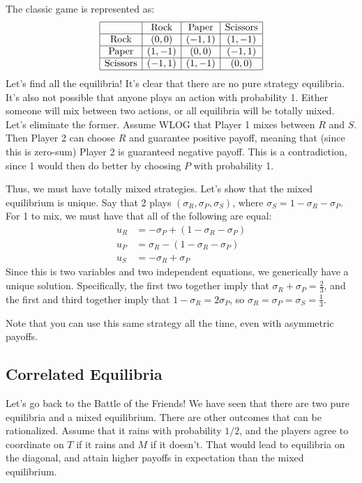 \documentclass[10pt]{article}
\begin{document}
\begin{example}
	 The classic game is represented as:
	\[
	\begin{array}{|c|c|c|c|}
		\hline
		& \text{Rock} & \text{Paper} & \text{Scissors} \\\hline
		\text{Rock} & (0,0) & (-1,1) & (1,-1) \\\hline
		\text{Paper} & (1,-1) & (0,0) & (-1,1) \\\hline 
		\text{Scissors} & (-1,1) & (1,-1) & (0,0) \\\hline
	\end{array}
	\]
	Let's find all the equilibria! It's clear that there are no pure strategy equilibria. It's also not possible that anyone plays an action with probability 1. Either someone will mix between two actions, or all equilibria will be totally mixed. Let's eliminate the former. Assume WLOG that Player 1 mixes between $R$ and $S$. Then Player 2 can choose $R$ and guarantee positive payoff, meaning that (since this is zero-sum) Player 2 is guaranteed negative payoff. This is a contradiction, since 1 would then do better by choosing $P$ with probability 1.
	
	Thus, we must have totally mixed strategies. Let's show that the mixed equilibrium is unique. Say that 2 plays $(\sigma_R,\sigma_P,\sigma_S)$, where $\sigma_S = 1 - \sigma_R - \sigma_P$. For 1 to mix, we must have that all of the following are equal:
	\begin{align*}
		u_R &= -\sigma_P + (1-\sigma_R - \sigma_P) \\ u_P &= \sigma_R  - (1 - \sigma_R - \sigma_P) \\ u_S &= -\sigma_R + \sigma_P 
	\end{align*}
	Since this is two variables and two independent equations, we generically have a unique solution. Specifically, the first two together imply that $\sigma_R + \sigma_P = \frac{2}{3}$, and the first and third together imply that $1-\sigma_R = 2\sigma_P$, so $\sigma_R = \sigma_P = \sigma_S = \frac{1}{3}$.
	
	Note that you can use this same strategy all the time, even with asymmetric payoffs.
\end{example}

\subsection{Correlated Equilibria}

Let's go back to the Battle of the  Friends! We have seen that there are two pure equilibria and a mixed equilibrium. There are other outcomes that can be rationalized. Assume that it rains with probability $1/2$, and the players agree to coordinate on $T$ if it rains and $M$ if it doesn't. That would lead to equilibria on the diagonal, and attain higher payoffs in expectation than the mixed equilibrium. 
\end{document}
